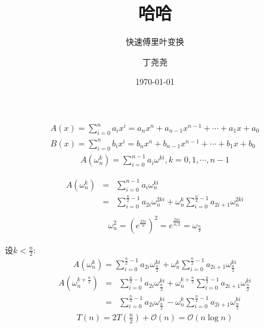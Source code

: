 \documentclass[9pt]{beamer}
\title{哈哈}
\subtitle{快速傅里叶变换}
\author{丁尧尧}
\institute{上海交通大学}
\date{\today}
\begin{document}
	\begin{frame}
		\begin{align*}
			A(x) = \sum_{i=0}^na_ix^i = a_nx^n+a_{n-1}x^{n-1}+\cdots+a_1x+a_0 \\ 
			B(x) = \sum_{i=0}^nb_ix^i = b_nx^n+b_{n-1}x^{n-1}+\cdots+b_1x+b_0
		\end{align*}
		\begin{align*}
			A(\omega_n^k) = \sum_{i=0}^{n-1}a_i\omega^{ki} , k = 0, 1, \cdots, n - 1
		\end{align*}
		
		\begin{eqnarray*} 
			A(\omega_n^k) &=& \sum_{i=0}^{n-1}a_i\omega_n^{ki} \\
			 &=&\sum_{i=0}^{\frac{n}{2}-1}a_{2i}\omega_n^{2ki}+\omega_n^k\sum_{i=0}^{\frac{n}{2}-1}a_{2i+1}\omega_n^{2ki} \\ 
		\end{eqnarray*}
		\begin{align*}
		\omega_n^2=\left(e^{\frac{2\pi i}{n}}\right)^2=e^{\frac{2\pi i}{n/2}}=\omega_{\frac{n}{2}}
		\end{align*}
		
	\end{frame}	
	\begin{frame}
		设$k < \frac{n}{2}$:
		\begin{align*}
			A(\omega_n^k) = \sum_{i=0}^{\frac{n}{2}-1}a_{2i}\omega_{\frac{n}{2}}^{ki}+\omega_n^{k}\sum_{i=0}^{\frac{n}{2}-1}a_{2i+1}\omega_{\frac{n}{2}}^{ki}
		\end{align*}
		\begin{eqnarray*} 
			A(\omega_n^{k+\frac{n}{2}}) &=& \sum_{i=0}^{\frac{n}{2}-1}a_{2i}\omega_{\frac{n}{2}}^{ki}+\omega_n^{k+\frac{n}{2}}\sum_{i=0}^{\frac{n}{2}-1}a_{2i+1}\omega_{\frac{n}{2}}^{ki} \\ &=&\sum_{i=0}^{\frac{n}{2}-1}a_{2i}\omega_{\frac{n}{2}}^{ki}-\omega_n^k\sum_{i=0}^{\frac{n}{2}-1}a_{2i+1}\omega_{\frac{n}{2}}^{ki} 
		\end{eqnarray*}
		\begin{align*}
		T(n) = 2T(\frac{n}{2})+\mathcal O(n) = \mathcal O(n\log n)
		\end{align*}
		
	\end{frame}
\end{document}
